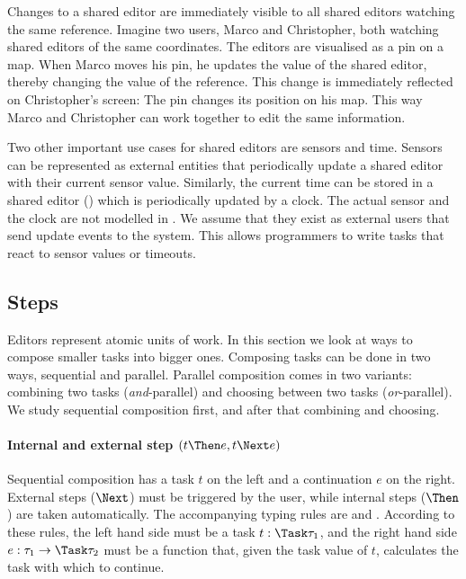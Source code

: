 Changes to a shared editor are immediately visible to all shared editors watching the same reference.
Imagine two users, Marco and Christopher, both watching shared editors of the same coordinates.
The editors are visualised as a pin on a map.
When Marco moves his pin, he updates the value of the shared editor, thereby changing the value of the reference.
This change is immediately reflected on Christopher's screen: The pin changes its position on his map.
This way Marco and Christopher can work together to edit the same information.

\label{sub:time}
Two other important use cases for shared editors are sensors and time.
Sensors can be represented as external entities that periodically update a shared editor with their current sensor value.
Similarly, the current time can be stored in a shared editor () which is periodically updated by a clock.
The actual sensor and the clock are not modelled in \TOPHAT.
We assume that they exist as external users that send update events to the system.
This allows programmers to write tasks that react to sensor values or timeouts.


\subsection{Steps}

Editors represent atomic units of work.
In this section we look at ways to compose smaller tasks into bigger ones.
Composing tasks can be done in two ways, sequential and parallel.
Parallel composition comes in two variants: combining two tasks (\emph{and}-parallel) and choosing between two tasks (\emph{or}-parallel).
We study sequential composition first, and after that combining and choosing.


\paragraph{Internal and external step $(t \Then e, t \Next e)$}
\label{sub:steps}

Sequential composition has a task $t$ on the left and a continuation $e$ on the right.
External steps ($\Next$) must be triggered by the user, while internal steps ($\Then$) are taken automatically.
The accompanying typing rules are  and .
According to these rules, the left hand side must be a task $t : \Task \tau_1$, and the right hand side $e : \tau_1 \to \Task \tau_2$ must be a function that, given the task value of $t$, calculates the task with which to continue.

